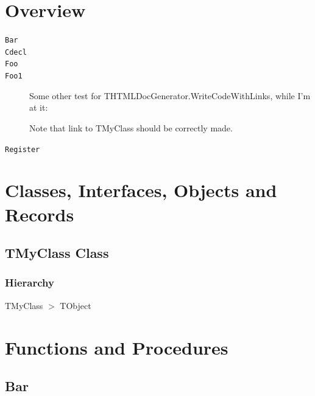 \documentclass{report}
\newif\ifpdf
\begin{document}
\section{Overview}
\begin{description}
\item[\texttt{\begin{ttfamily}TMyClass\end{ttfamily} Class}]
\end{description}
\begin{description}
\item[\texttt{Bar}]
\item[\texttt{Cdecl}]
\item[\texttt{Foo}]
\item[\texttt{Foo1}]Some other test for THTMLDocGenerator.WriteCodeWithLinks, while I'm at it:

Note that link to TMyClass should be correctly made.
\item[\texttt{Register}]
\end{description}
\section{Classes, Interfaces, Objects and Records}
\ifpdf
\subsection*{\large{\textbf{TMyClass Class}}\normalsize\hspace{1ex}\hrulefill}
\else
\subsection*{TMyClass Class}
\fi
\label{ok_directive_as_identifier.TMyClass}
\subsubsection*{\large{\textbf{Hierarchy}}\normalsize\hspace{1ex}\hfill}
TMyClass {$>$} TObject
\section{Functions and Procedures}
\ifpdf
\subsection*{\large{\textbf{Bar}}\normalsize\hspace{1ex}\hrulefill}
\else
\end{document}
